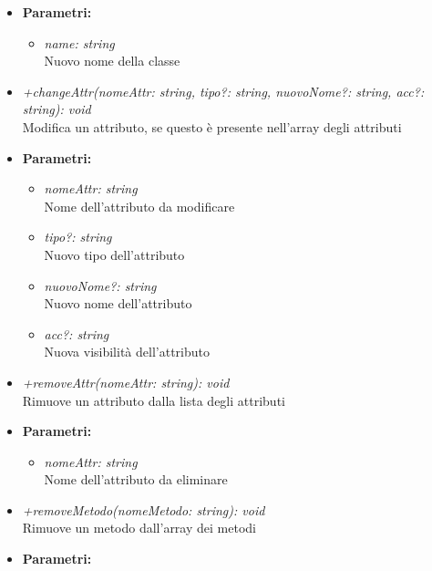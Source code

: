 \begin{itemize}
\begin{itemize}
            			\item \textbf{Parametri:}\\
            				\begin{itemize}
            					\item \emph{name: string}\\
            					Nuovo nome della classe
            				\end{itemize}
            			\item \emph{+changeAttr(nomeAttr: string, tipo?: string, nuovoNome?: string, acc?: string): void}\\
            			Modifica un attributo, se questo è presente nell'array degli attributi
            			\item \textbf{Parametri:}\\
            				\begin{itemize}
            					\item \emph{nomeAttr: string}\\
            					Nome dell'attributo da modificare
            					\item \emph{tipo?: string}\\
            					Nuovo tipo dell'attributo
            					\item \emph{nuovoNome?: string}\\
            					Nuovo nome dell'attributo
            					\item \emph{acc?: string}\\
            					Nuova visibilità dell'attributo
            				\end{itemize}
            			\item \emph{+removeAttr(nomeAttr: string): void}\\
            			Rimuove un attributo dalla lista degli attributi
            			\item \textbf{Parametri:}\\
            				\begin{itemize}
            					\item \emph{nomeAttr: string}\\
            					Nome dell'attributo da eliminare
            				\end{itemize}
            			\item \emph{+removeMetodo(nomeMetodo: string): void}\\
            			Rimuove un metodo dall'array dei metodi
            			\item \textbf{Parametri:}\\

\end{itemize}
\end{itemize}
